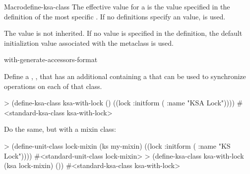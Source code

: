 \documentclass[10pt,twoside,english,pdftex]{article}
\begin{document}
\begin{functiondoc}{Macro}{define-ksa-class}
The effective  value for a
 is the value specified in the definition of the
most specific . If no definitions specify an
 value, \nil{} is used.

The  value is not inherited.  If
no value is specified in the  definition, the
default initializtion value associated with the metaclass is used.

\begin{alsos}{with-generate-accessors-format}
\also[define-ks]
\end{alsos}

\fnexamples
Define a ,
, that has an additional 
containing a  that can be used to synchronize
operations on each  of that class.
\begin{example}
> (define-ksa-class ksa-with-lock ()
    ((lock :initform ( :name "KSA Lock"))))
#<standard-ksa-class ksa-with-lock>
\end{example}

Do the same, but with a mixin class:
\begin{example}
> (define-unit-class lock-mixin (ks my-mixin)
    ((lock :initform ( :name "KS Lock"))))
#<standard-unit-class lock-mixin>
> (define-ksa-class ksa-with-lock (ksa lock-mixin)
    ())
#<standard-ksa-class ksa-with-lock>
\end{example}

\end{functiondoc}

\end{document}
